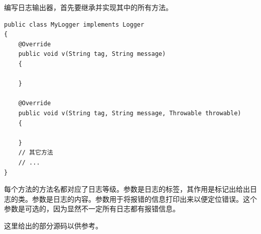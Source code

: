 编写日志输出器，首先要继承并实现其中的所有方法。

\begin{lstlisting}[style=Java, caption={Logger初始布局},label={lst:Logger初始布局}]
public class MyLogger implements Logger
{
    @Override
    public void v(String tag, String message)
    {

    }

    @Override
    public void v(String tag, String message, Throwable throwable)
    {

    }
    // 其它方法
    // ...
}
\end{lstlisting}

每个方法的方法名都对应了日志等级。参数是日志的标签，其作用是标记出给出日志的类。参数是日志的内容。参数用于将报错的信息打印出来以便定位错误。这个参数是可选的，因为显然不一定所有日志都有报错信息。

这里给出的部分源码以供参考。


